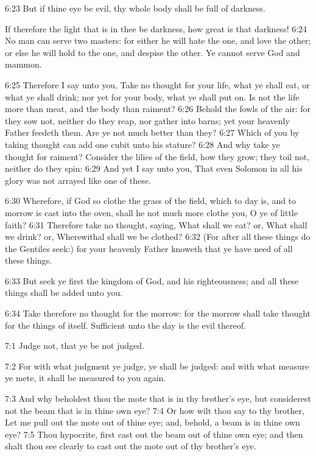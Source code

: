 6:23 But if thine eye be evil, thy whole body shall be full of
darkness.

If therefore the light that is in thee be darkness, how great is that
darkness!  6:24 No man can serve two masters: for either he will hate
the one, and love the other; or else he will hold to the one, and
despise the other. Ye cannot serve God and mammon.

6:25 Therefore I say unto you, Take no thought for your life, what ye
shall eat, or what ye shall drink; nor yet for your body, what ye
shall put on. Is not the life more than meat, and the body than
raiment?  6:26 Behold the fowls of the air: for they sow not, neither
do they reap, nor gather into barns; yet your heavenly Father feedeth
them. Are ye not much better than they?  6:27 Which of you by taking
thought can add one cubit unto his stature?  6:28 And why take ye
thought for raiment? Consider the lilies of the field, how they grow;
they toil not, neither do they spin: 6:29 And yet I say unto you, That
even Solomon in all his glory was not arrayed like one of these.

6:30 Wherefore, if God so clothe the grass of the field, which to day
is, and to morrow is cast into the oven, shall he not much more clothe
you, O ye of little faith?  6:31 Therefore take no thought, saying,
What shall we eat? or, What shall we drink? or, Wherewithal shall we
be clothed?  6:32 (For after all these things do the Gentiles seek:)
for your heavenly Father knoweth that ye have need of all these
things.

6:33 But seek ye first the kingdom of God, and his righteousness; and
all these things shall be added unto you.

6:34 Take therefore no thought for the morrow: for the morrow shall
take thought for the things of itself. Sufficient unto the day is the
evil thereof.

7:1 Judge not, that ye be not judged.

7:2 For with what judgment ye judge, ye shall be judged: and with what
measure ye mete, it shall be measured to you again.

7:3 And why beholdest thou the mote that is in thy brother's eye, but
considerest not the beam that is in thine own eye?  7:4 Or how wilt
thou say to thy brother, Let me pull out the mote out of thine eye;
and, behold, a beam is in thine own eye?  7:5 Thou hypocrite, first
cast out the beam out of thine own eye; and then shalt thou see
clearly to cast out the mote out of thy brother's eye.

